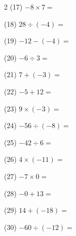 \documentclass[a4paper, 11pt]{ltjsarticle}
\begin{document}
\begin{multicols*}{2}
\noindent (17) \quad $-8\times7 =$ \vspace*{\fill}

\noindent (18) \quad $28\div(-4) =$ \vspace*{\fill}

\noindent (19) \quad $-12-(-4) =$ \vspace*{\fill}

\noindent (20) \quad $-6\div3 =$ \vspace*{\fill}

\noindent (21) \quad $7+(-3) =$ \vspace*{\fill}

\noindent (22) \quad $-5+12 =$ \vspace*{\fill}

\noindent (23) \quad $9\times(-3) =$ \vspace*{\fill}

\noindent (24) \quad $-56\div(-8) =$ \vspace*{\fill}

\noindent (25) \quad $-42\div6 =$ \vspace*{\fill}

\noindent (26) \quad $4\times(-11) =$ \vspace*{\fill}

\noindent (27) \quad $-7\times0 =$ \vspace*{\fill}

\noindent (28) \quad $-0+13 =$ \vspace*{\fill}

\noindent (29) \quad $14+(-18) =$ \vspace*{\fill}

\noindent (30) \quad $-60\div(-12) =$ \vspace*{\fill}
\end{multicols*}

\newpage
\end{document}
